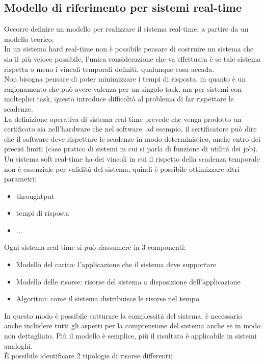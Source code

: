 \documentclass{article}
\begin{document}
\subsection{Modello di riferimento per sistemi real-time}
Occorre definire un modello per realizzare il sistema real-time, a partire da un modello teorico.\\ In  un sistema hard real-time non è possibile pensare di costruire un sistema che sia il più veloce possibile, l'unica considerazione che va effettuata è se tale sistema rispetta o meno i vincoli temporali definiti, qualunque cosa accada.\\ Non bisogna pensare di poter minimizzare i tempi di risposta, in quanto è un ragionamento che può avere valenza per un singolo task, ma per sistemi con molteplici task, questo introduce difficoltà al problema di far rispettare le scadenze.\\ La definizione operativa di sistema real-time prevede che venga prodotto un certificato sia nell'hardware che nel software. ad esempio, il certificatore può dire che il software deve rispettare le scadenze in modo deterministico, anche entro dei precisi limiti (caso pratico di sistemi in cui si parla di funzione di utilità dei job).\\ Un sistema soft real-time ha dei vincoli in cui il rispetto della scadenza temporale non è essenziale per validità del sistema, quindi è possibile ottimizzare altri parametri:
\begin{itemize}
\item throughtput
\item tempi di risposta
\item ...
\end{itemize} 
Ogni sistema real-time si può riassumere in 3 componenti:
\begin{itemize}
\item Modello del carico: l'applicazione che il sistema deve supportare
\item Modello delle risorse: risorse del sistema a disposizione dell'applicazione
\item Algoritmi: come il sistema distribuisce le risorse nel tempo
\end{itemize}
In questo modo è possibile catturare la complessità del sistema, è necessario anche includere tutti gli aspetti per la comprensione del sistema anche se in modo non dettagliato. Più il modello è semplice, più il risultato è applicabile in sistemi analoghi.\\ È possibile identificare 2 tipologie di risorse differenti:
\end{document}
